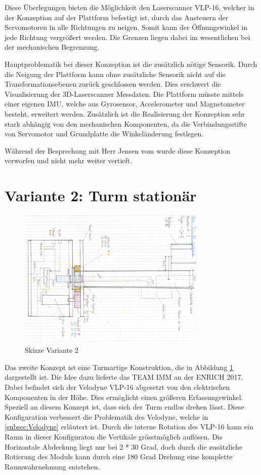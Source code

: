  Diese Überlegungen bieten die Möglichkeit den Laserscanner VLP-16, welcher in der Konzeption auf der Plattform befestigt ist, durch das Ansteuern der Servomotoren in alle Richtungen zu neigen. Somit kann  der Öffnungswinkel in jede Richtung vergrößert werden. Die Grenzen liegen dabei im wesentlichen bei der mechanischen Begrenzung.
 
 Hauptproblematik bei dieser Konzeption ist die zusätzlich nötige Sensorik. Durch die Neigung der Plattform kann ohne zusätzliche Sensorik nicht auf die Transformationsebenen zurück geschlossen werden. Dies erschwert die Visualisierung der 3D-Laserscanner Messdaten. Die Plattform müsste mittels einer eigenen \ac {IMU}, welche aus Gyrosensor, Accelerometer und Magnetometer besteht, erweitert werden. Zusätzlich ist die Realisierung der Konzeption sehr stark abhängig von den mechanischen Komponenten, da die Verbindungsstifte von Servomotor und Grundplatte die Winkeländerung festlegen.
 
 Während der Besprechung mit Herr Jensen vom  wurde diese Konzeption verworfen und nicht mehr weiter vertieft.
 

\section {Variante 2: Turm stationär}
\label{sec:var2}

\begin{figure}[H]
	\centering
	\includegraphics[angle=90,width=0.8\textwidth]{resources/skizze_unrotierend.PNG}
	\caption{Skizze Variante 2 }
	\label{fig:skizze_unrotierend}
\end{figure} 

Das zweite Konzept ist eine Turmartige Konstruktion, die in Abbildung \ref{fig:skizze_unrotierend} dargestellt ist. Die Idee dazu lieferte das TEAM IMM an der \ac{ENRICH} 2017. Dabei befindet sich der Velodyne VLP-16 abgesetzt von den elektrischen Komponenten in der Höhe. Dies ermöglicht einen größeren Erfassungswinkel. Speziell an diesem Konzept ist, dass sich der Turm endlos drehen lässt. Diese Konfiguration verbessert die Problematik des Velodyne, welche in \ref{subsec:Velodyne} erläutert ist. Durch die interne Rotation des VLP-16 kann ein Raum in dieser Konfiguraton die Vertikale grösstmöglich auflösen. Die Horizontale Abdeckung liegt nur bei 2 * 30 Grad, doch durch die zusätzliche Rotierung des Moduls kann durch eine 180 Grad Drehung eine komplette Raumwahrnehmung entstehen.

